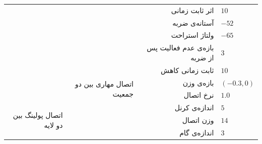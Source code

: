 \documentclass[12pt]{report}
\begin{document}
\begin{table}[p]
{\begin{tabular}{|rrrl|}
\multicolumn{1}{|r|}{}                                          & \multicolumn{1}{r|}{}                                          & \multicolumn{1}{r|}{اثر ثابت زمانی}               & $10$                      \\ \cline{3-4} 
\multicolumn{1}{|r|}{}                                          & \multicolumn{1}{r|}{}                                          & \multicolumn{1}{r|}{آستانه‌ی ضربه}                & $-52$                     \\ \cline{3-4} 
\multicolumn{1}{|r|}{}                                          & \multicolumn{1}{r|}{}                                          & \multicolumn{1}{r|}{ولتاژ استراحت}                & $-65$                     \\ \cline{3-4} 
\multicolumn{1}{|r|}{}                                          & \multicolumn{1}{r|}{}                                          & \multicolumn{1}{r|}{بازه‌ی عدم فعالیت پس از ضربه} & $3$                       \\ \cline{3-4} 
\multicolumn{1}{|r|}{}                                          & \multicolumn{1}{r|}{}                                          & \multicolumn{1}{r|}{ثابت زمانی کاهش}              & $10$                      \\ \cline{2-4} 
\multicolumn{1}{|r|}{}                                          & \multicolumn{1}{r|}{\multirow{2}{*}{اتصال مهاری بین دو جمعیت}} & \multicolumn{1}{r|}{بازه‌ی وزن}                   & $(-0.3,0)$                \\ \cline{3-4} 
\multicolumn{1}{|r|}{}                                          & \multicolumn{1}{r|}{}                                          & \multicolumn{1}{r|}{نرخ اتصال}                    & $1.0$                     \\ \hline
\multicolumn{1}{|r|}{\multirow{3}{*}{اتصال پولینگ بین دو لایه}} & \multicolumn{2}{r|}{اندازه‌ی کرنل}                                                                                 & $5$                       \\ \cline{2-4} 
\multicolumn{1}{|r|}{}                                          & \multicolumn{2}{r|}{وزن اتصال}                                                                                     & $14$                      \\ \cline{2-4} 
\multicolumn{1}{|r|}{}                                          & \multicolumn{2}{r|}{اندازه‌ی گام}                                                                                  & $3$                       \\ \hline

\end{tabular}}
\end{table}
\end{document}
